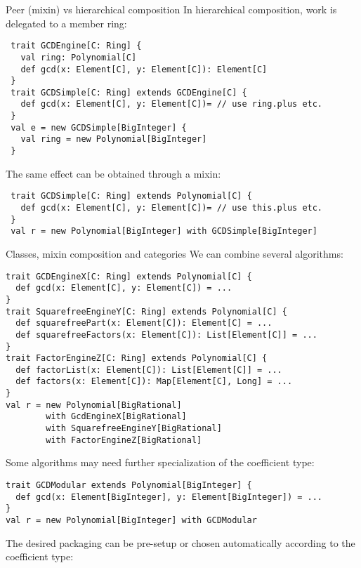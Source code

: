 \documentclass[final]{beamer}
\begin{document}
\begin{frame}[fragile]
\begin{columns}[t]
\begin{column}{.3\linewidth}
  \begin{block}{\large Peer (mixin) vs hierarchical composition}
\tiny %
{\footnotesize In hierarchical composition, work is delegated to
a member ring:}\par
\begin{lstlisting}
 trait GCDEngine[C: Ring] {
   val ring: Polynomial[C]
   def gcd(x: Element[C], y: Element[C]): Element[C]
 }
 trait GCDSimple[C: Ring] extends GCDEngine[C] {
   def gcd(x: Element[C], y: Element[C])= // use ring.plus etc.
 }
 val e = new GCDSimple[BigInteger] {
   val ring = new Polynomial[BigInteger]
 }
\end{lstlisting}
{\footnotesize The same effect can be obtained through a mixin:}\par
\begin{lstlisting}
 trait GCDSimple[C: Ring] extends Polynomial[C] {
   def gcd(x: Element[C], y: Element[C])= // use this.plus etc.
 }
 val r = new Polynomial[BigInteger] with GCDSimple[BigInteger]
\end{lstlisting}
  \end{block}
  \hfill
  \begin{block}{\large Classes, mixin composition and categories}
\tiny %
{\footnotesize We can combine several algorithms:}\par
\begin{lstlisting}
trait GCDEngineX[C: Ring] extends Polynomial[C] {
  def gcd(x: Element[C], y: Element[C]) = ...
}
trait SquarefreeEngineY[C: Ring] extends Polynomial[C] {
  def squarefreePart(x: Element[C]): Element[C] = ...
  def squarefreeFactors(x: Element[C]): List[Element[C]] = ...
}
trait FactorEngineZ[C: Ring] extends Polynomial[C] {
  def factorList(x: Element[C]): List[Element[C]] = ...
  def factors(x: Element[C]): Map[Element[C], Long] = ...
}
val r = new Polynomial[BigRational]
        with GcdEngineX[BigRational] 
        with SquarefreeEngineY[BigRational]
        with FactorEngineZ[BigRational]
\end{lstlisting}
{\footnotesize Some algorithms may need further specialization
of the coefficient type:}\par
\begin{lstlisting}
trait GCDModular extends Polynomial[BigInteger] {
  def gcd(x: Element[BigInteger], y: Element[BigInteger]) = ...
}
val r = new Polynomial[BigInteger] with GCDModular
\end{lstlisting}
{\footnotesize The desired packaging can be pre-setup or chosen
automatically according to the coefficient type:}\par

\end{block}
\end{column}
\end{columns}
\end{frame}
\end{document}
